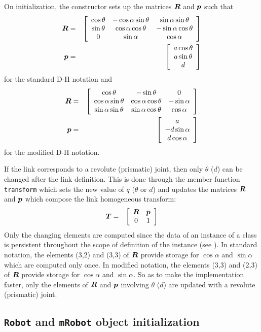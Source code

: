 \documentclass[11pt,fleqn,letterpaper]{report}
\newcommand{\mbold}[1]{\mbox{\boldmath $ #1 $}}
\newcommand{\matr}[2]{\left[\begin{array}{#1} #2 \end{array}\right]}
\begin{document}
On initialization, the constructor sets up the matrices $\mbold{R}$ and $\mbold{p}$ such that
\begin{eqnarray}
\mbold{R} & = & \matr{ccc}{ 
\cos \theta & -\cos \alpha \sin \theta & \sin \alpha \sin \theta \\
\sin \theta & \cos \alpha \cos \theta & -\sin \alpha \cos \theta \\
0 & \sin \alpha & \cos \alpha } \\
\mbold{p} & = & \matr{c}{a \cos \theta \\ a \sin \theta \\ d}
\end{eqnarray}
for the standard D-H notation and
\begin{eqnarray}
  \mbold{R} & = & \matr{ccc}{ 
    \cos \theta & -\sin \theta & 0 \\
    \cos \alpha \sin \theta & \cos \alpha \cos \theta & -\sin \alpha \\
    \sin \alpha \sin \theta & \sin \alpha \cos \theta & \cos \alpha } \\
  \mbold{p} & = & \matr{c}{a \\ - d \sin \alpha \\ d \cos \alpha }
\end{eqnarray}
for the modified D-H notation.

If the link corresponds to a revolute (prismatic) joint, then
only $\theta$ ($d$) can be changed after the link definition. This is done through 
the member function {\tt transform} which sets the new value of $q$ ($\theta$ or $d$) and
updates the matrices $\mbold{R}$ and $\mbold{p}$ which compose the link homogeneous transform:
\begin{eqnarray}
\mbold{T} & = & \matr{cc}{
\mbold{R} & \mbold{p} \\
0 & 1 }
\end{eqnarray}
Only the changing elements are computed since the data of an instance
of a class is persistent throughout the scope of definition of the
instance (see \cite{eckel}). In standard notation, the elements (3,2)
and (3,3) of $\mbold{R}$ provide storage for $\cos \alpha$ and $\sin
\alpha$ which are computed only once. In modified notation, the
elements (3,3) and (2,3) of $\mbold{R}$ provide storage for $\cos
\alpha$ and $\sin \alpha$. So as to make the implementation faster,
only the elements of $\mbold{R}$ and $\mbold{p}$ involving $\theta$
($d$) are updated with a revolute (prismatic) joint.


\subsection{\texttt{Robot} and \texttt{mRobot} object initialization}
\end{document}
